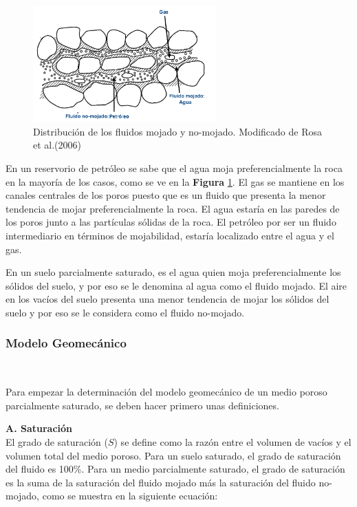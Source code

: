 \begin{figure}[!ht]
\centering
\includegraphics[width=7cm]{Imagenes/Mojabilidad.png}
\caption[Distribución de los fluidos mojado y no-mojado]{Distribución de los fluidos mojado y no-mojado. Modificado de Rosa et al.(2006) \cite{Rosa2006EngenhariaPetroleo}}
\label{fig:fig31}
\end{figure}

En un reservorio de petróleo se sabe que el agua moja preferencialmente la roca en la mayoría de los casos, como se ve en la \textbf{Figura} \ref{fig:fig31}. El gas se mantiene en los canales centrales de los poros puesto que es un fluido que presenta la menor tendencia de mojar preferencialmente la roca. El agua estaría en las paredes de los poros junto a las partículas sólidas de la roca. El petróleo por ser un fluido intermediario en términos de mojabilidad, estaría localizado entre el agua y el gas.\bigskip

En un suelo parcialmente saturado, es el agua quien moja preferencialmente los sólidos del suelo, y por eso se le denomina al agua como el fluido mojado. El aire en los vacíos del suelo presenta una menor tendencia de mojar los sólidos del suelo y por eso se le considera como el fluido no-mojado.\bigskip

\subsubsection{Modelo Geomecánico}~\hypertarget{sec:sec3321}{}
\label{sec:sec3321}

Para empezar la determinación del modelo geomecánico de un medio poroso parcialmente saturado, se deben hacer primero unas definiciones.\bigskip\bigskip

\textbf{A. Saturación}
\\
El grado de saturación ($S$) se define como la razón entre el volumen de vacíos y el volumen total del medio poroso. Para un suelo saturado, el grado de saturación del fluido es 100\%. Para un medio parcialmente saturado, el grado de saturación es la suma de la saturación del fluido mojado más la saturación del fluido no-mojado, como se muestra en la siguiente ecuación:\bigskip

